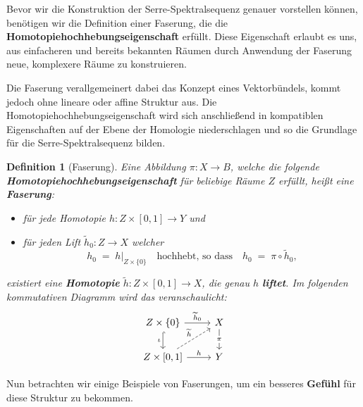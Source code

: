 \documentclass[12pt]{article}
\numberwithin{conj}{section}
\newtheorem{definition}[conj]{Definition}
\begin{document}
    Bevor wir die Konstruktion der Serre-Spektralsequenz genauer vorstellen können,
    benötigen wir die Definition einer Faserung, die die \textbf{Homotopiehochhebungseigenschaft}
    erfüllt. Diese Eigenschaft erlaubt es uns, aus einfacheren und bereits
    bekannten Räumen durch Anwendung der Faserung neue, komplexere Räume zu konstruieren.

    Die Faserung verallgemeinert dabei das Konzept eines Vektorbündels, kommt
    jedoch ohne lineare oder affine Struktur aus. Die Homotopiehochhebungseigenschaft
    wird sich anschließend in kompatiblen Eigenschaften auf der Ebene der Homologie
    niederschlagen und so die Grundlage für die Serre-Spektralsequenz bilden.

    \begin{definition}[Faserung]
        Eine Abbildung $\pi : X \to B$, welche die folgende \textbf{Homotopiehochhebungseigenschaft}
        für beliebige Räume $Z$ erfüllt, heißt eine \textbf{Faserung}:
        \begin{itemize}[noitemsep]
            \item für jede Homotopie $h : Z \times [0,1] \to Y$ und

            \item für jeden Lift $\widetilde{h}_{0} : Z \to X$ welcher
                \[
                    h_{0} \;=\; h\vert_{Z\times \{0\}}\quad\text{hochhebt, so dass}\quad h_{0} \;=\; \pi
                    \circ \widetilde{h}_{0},
                \]
        \end{itemize}
        existiert eine \textbf{Homotopie} $\widetilde{h}: Z \times [0,1] \to X$, die
        genau $h$ \textbf{liftet}. Im folgenden kommutativen Diagramm wird das
        veranschaulicht:
        \[
            \begin{tikzcd}
                {Z\times\{0\}} & X \\ {Z\times[0,1]} & Y \arrow["{\widetilde{h}_0}",
                from=1-1, to=1-2] \arrow["\iota"', hook, from=1-1, to=2-1] \arrow["\pi"{description},
                from=1-2, to=2-2] \arrow["{\widetilde{h}}", dashed, from=2-1, to=1-2] \arrow["h",
                from=2-1, to=2-2]
            \end{tikzcd}
        \]
    \end{definition}

    \noindent
    Nun betrachten wir einige Beispiele von Faserungen, um ein besseres \textbf{Gefühl}
    für diese Struktur zu bekommen.
\end{document}
